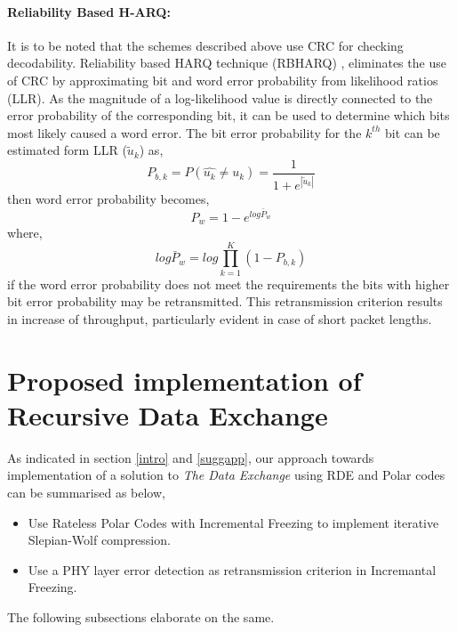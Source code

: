 \documentclass[
11pt, %
a4paper, %
oneside, %
headinclude,footinclude, %
BCOR5mm, %
]{scrartcl}
\begin{document}
\paragraph{Reliability Based H-ARQ:}
It is to be noted that the schemes described above use CRC for checking decodability. Reliability based HARQ technique (RBHARQ) \cite{rbharq}, eliminates the use of CRC by approximating bit and word error probability from likelihood ratios (LLR).  As the magnitude of a log-likelihood value is directly
connected to the error probability of the corresponding
bit, it can be used to determine which bits most
likely caused a word error. The bit error probability for the $k^{th}$ bit can be estimated form LLR ($\tilde{u}_k$) as,
\begin{equation}
P_{b,k}=P(\hat{u_k} \neq u_k) = \frac{1}{1+e^{|\tilde{u}_k|}}
\end{equation}
then word error probability becomes, 
\begin{equation}
P_w=1-e^{log\bar{P}_w}
\end{equation}
where, $$log\bar{P}_w=log\prod_{k=1}^K (1- P_{b,k})$$ 
if the word error probability does not meet the requirements the bits with higher bit error probability may be retransmitted. This retransmission criterion results in increase of throughput, particularly evident in case of short packet lengths.



\newpage
\section{Proposed implementation of Recursive Data Exchange} \label{propsol}
As indicated in section \ref{intro} and \ref{suggapp}, our approach towards implementation of a solution to \emph{The Data Exchange} using RDE and Polar codes can be summarised as below, 
\begin{itemize}
\item{Use Rateless Polar Codes with Incremental Freezing to implement iterative Slepian-Wolf compression.}
\item{Use a PHY layer error detection as retransmission criterion in Incremantal Freezing.}
\end{itemize}
The following subsections elaborate on the same.
\end{document}
